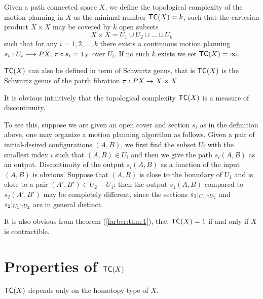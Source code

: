 \begin{defn}
    Given a path connected space $X$, we define the topological complexity of the motion planning in $X$ as the minimal number $\textsf{TC}(X) = k$, such that the cartesian product $X \times X$ may be covered by $k$ open subsets
    \[
        X \times X  = U_1 \cup U_2 \cup \dots \cup U_k
    \]
    such that for any $i = 1,2, \ldots, k$ there exists a continuous motion planning $s_i: U_i \longrightarrow PX, \, \pi \circ s_i = 1_X$ over $U_i$. If no such $k$ exists we set $\textsf{TC}(X) = \infty$.
\end{defn}

\begin{rem}
    $\textsf{TC}(X)$ can also be defined in term of Schwartz genus, that is $\textsf{TC}(X)$ is the Schwartz genus of the patrh fibration $\pi : PX \rightarrow X \times X$ \cite{farber2007symmetric}.

    It is obvious intuitively that the topological complexity $\textsf{TC}(X)$ is a measure of discontinuity.

    To see this, suppose we are given an open cover and section $s_i$ as in the definition above, one may organize a motion planning algorithm as follows. Given a pair of initial-desired configurations
    $(A, B)$, we first find the subset $U_i$ with the smallest index $i$ such that $(A,B) \in U_i$ and then we give the path $s_i(A,B)$ as an output. Discontinuity of the output $s_i(A,B)$ as a function of the input $(A,B)$ is obvious. 
    Suppose that $(A,B)$ is close to the boundary of $U_1$ and is close to a pair $(A', B') \in U_2 - U_1$; then the output $s_1(A,B)$ compared to $s_2(A',B')$ may be completely different, since the sections $\displaystyle s_1|_{U_1 \cap U_2}$ and $\displaystyle s_2|_{U_1 \cap U_2}$ are in general distinct.

    It is also obvious from theorem (\ref{farber:thm:1}), that $\textsf{TC}(X) = 1$ if and only if $X$ is contractible.
\end{rem}

\section{Properties of $\textsf{TC}(X)$}

\begin{thm}\label{homtopy:invariance}
    $\textsf{TC}(X)$ depends only on the homotopy type of $X$.
\end{thm}

